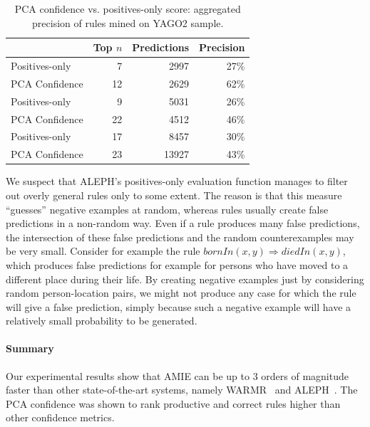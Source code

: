 \begin{table}
\begin{tabular}{l|rrr}
	    & Top $n$ & Predictions & Precision \\
 \hline
 Positives-only & 7 & 2997 & 27\% \\
 PCA Confidence & 12 & 2629 & 62\% \\
 \hline
 Positives-only & 9 & 5031 & 26\% \\
 PCA Confidence & 22 & 4512& 46\% \\
 \hline
 Positives-only & 17 & 8457 & 30\% \\
 PCA Confidence & 23 & 13927  & 43\% \\
\end{tabular}
\caption{PCA confidence vs. positives-only score: aggregated precision of rules mined on YAGO2 sample.}
\label{alephres}
\end{table}

We suspect that ALEPH's positives-only evaluation function manages to filter out overly general rules only to some extent.
The reason is that this measure ``guesses'' negative examples at random, whereas rules usually create false predictions in a non-random way.
Even if a rule produces many false predictions, the intersection of these false predictions and the random counterexamples may be very small.
Consider for example the rule $bornIn(x,y) \Rightarrow diedIn(x,y)$, which produces false predictions for example for persons who have moved
to a different place during their life.
By creating negative examples just by considering random person-location pairs,
we might not produce any case for which the rule will give a false prediction,
simply because such a negative example will have a relatively small probability to be generated.

\paragraph{Summary}
Our experimental results show that AMIE can be up to 3 orders of magnitude faster
than other state-of-the-art systems, namely WARMR~\cite{GoeVan02} and ALEPH~\cite{Muggleton:1996:LPD:647996.742465}.
The PCA confidence was shown to rank productive and correct rules higher than other confidence metrics.


